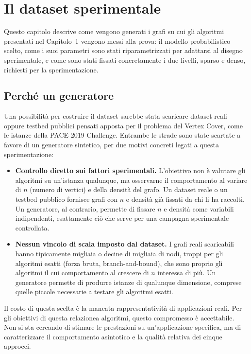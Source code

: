 \chapter{Il dataset sperimentale}

Questo capitolo descrive come vengono generati i grafi su cui gli algoritmi presentati nel Capitolo~1 vengono messi alla prova: il modello probabilistico scelto, come i suoi parametri sono stati riparametrizzati per adattarsi al disegno sperimentale, e come sono stati fissati concretamente i due livelli, sparso e denso, richiesti per la sperimentazione.

\section{Perché un generatore}

Una possibilità per costruire il dataset sarebbe stata scaricare dataset reali oppure testbed pubblici pensati apposta per il problema del Vertex Cover, come le istanze della PACE 2019 Challenge. Entrambe le strade sono state scartate a favore di un generatore sintetico, per due motivi concreti legati a questa sperimentazione:

\begin{itemize}
    \item \textbf{Controllo diretto sui fattori sperimentali.} L'obiettivo non è valutare gli algoritmi su un'istanza qualunque, ma osservarne il comportamento al variare di $n$ (numero di vertici) e della densità del grafo. Un dataset reale o un testbed pubblico fornisce grafi con $n$ e densità già fissati da chi li ha raccolti. Un generatore, al contrario, permette di fissare $n$ e densità come variabili indipendenti, esattamente ciò che serve per una campagna sperimentale controllata.

    \item \textbf{Nessun vincolo di scala imposto dal dataset.} I grafi reali scaricabili hanno tipicamente migliaia o decine di migliaia di nodi, troppi per gli algoritmi esatti (forza bruta, branch-and-bound), che sono proprio gli algoritmi il cui comportamento al crescere di $n$ interessa di più. Un generatore permette di produrre istanze di qualunque dimensione, comprese quelle piccole necessarie a testare gli algoritmi esatti.
\end{itemize}

Il costo di questa scelta è la mancata rappresentatività di applicazioni reali. 
Per gli obiettivi di questa relazionea algoritmi, questo compromesso è accettabile. 
Non si sta cercando di stimare le prestazioni su un'applicazione specifica, ma di caratterizzare il comportamento asintotico e la qualità relativa dei cinque approcci.

